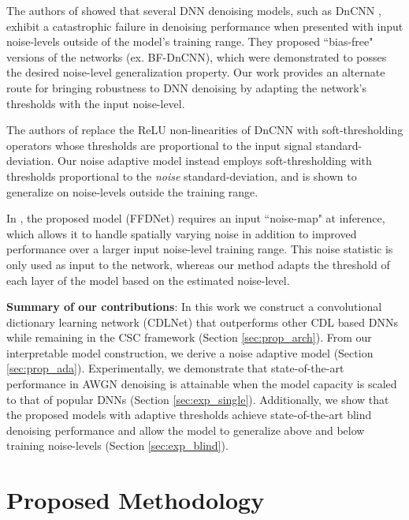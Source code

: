 \documentclass[conference]{IEEEtran}
\newcommand{\soa}{state-of-the-art }
\begin{document}
The authors of \cite{Mohan2020} showed that several DNN denoising models, such as DnCNN \cite{DnCNN}, exhibit a catastrophic failure in denoising performance when presented with input noise-levels outside of the model's training range. They proposed ``bias-free" versions of the networks (ex. BF-DnCNN), which were demonstrated to posses the desired noise-level generalization property. Our work provides an alternate route for bringing robustness to DNN denoising by adapting the network's thresholds with the input noise-level. 

The authors of \cite{Isogawa2017} replace the ReLU non-linearities of DnCNN \cite{DnCNN} with soft-thresholding operators whose thresholds are proportional to the input signal standard-deviation. 
Our noise adaptive model instead employs soft-thresholding with thresholds proportional to the \textit{noise} standard-deviation, and is shown to generalize on noise-levels outside the training range.

In \cite{FFDNet}, the proposed model (FFDNet) requires an input ``noise-map" at inference, which allows it to handle spatially varying noise in addition to improved performance over a larger input noise-level training range. This noise statistic is only used as input to the network, whereas our method adapts the threshold of each layer of the model based on the estimated noise-level. 

\textbf{Summary of our contributions}: In this work we construct a convolutional dictionary learning network (CDLNet) that outperforms other CDL based DNNs while remaining in the CSC framework (Section \ref{sec:prop_arch}). From our interpretable model construction, we derive a noise adaptive model (Section \ref{sec:prop_ada}). Experimentally, we demonstrate that \soa performance in AWGN denoising is attainable when the model capacity is scaled to that of popular DNNs (Section \ref{sec:exp_single}). Additionally, we show that the proposed models with adaptive thresholds achieve \soa blind denoising performance and allow the model to generalize above and below training noise-levels (Section \ref{sec:exp_blind}). 

\section{Proposed Methodology} \label{sec:proposed}
\end{document}
